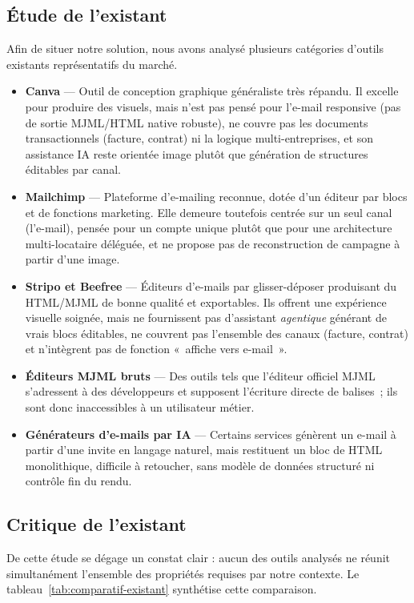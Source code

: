 \documentclass[12pt,a4paper,oneside]{report}
\begin{document}
\subsection{Étude de l'existant}
Afin de situer notre solution, nous avons analysé plusieurs catégories
d'outils existants représentatifs du marché.

\begin{itemize}[leftmargin=1.4cm]
  \item \textbf{Canva} — Outil de conception graphique généraliste très
  répandu. Il excelle pour produire des visuels, mais n'est pas pensé pour
  l'e-mail responsive (pas de sortie MJML/HTML native robuste), ne couvre
  pas les documents transactionnels (facture, contrat) ni la logique
  multi-entreprises, et son assistance IA reste orientée image plutôt que
  génération de structures éditables par canal.

  \item \textbf{Mailchimp} — Plateforme d'e-mailing reconnue, dotée d'un
  éditeur par blocs et de fonctions marketing. Elle demeure toutefois
  centrée sur un seul canal (l'e-mail), pensée pour un compte unique plutôt
  que pour une architecture multi-locataire déléguée, et ne propose pas de
  reconstruction de campagne à partir d'une image.

  \item \textbf{Stripo et Beefree} — Éditeurs d'e-mails par glisser-déposer
  produisant du HTML/MJML de bonne qualité et exportables. Ils offrent une
  expérience visuelle soignée, mais ne fournissent pas d'assistant
  \emph{agentique} générant de vrais blocs éditables, ne couvrent pas
  l'ensemble des canaux (facture, contrat) et n'intègrent pas de
  fonction «~affiche vers e-mail~».

  \item \textbf{Éditeurs MJML bruts} — Des outils tels que l'éditeur
  officiel MJML s'adressent à des développeurs et supposent l'écriture
  directe de balises~; ils sont donc inaccessibles à un utilisateur métier.

  \item \textbf{Générateurs d'e-mails par IA} — Certains services génèrent
  un e-mail à partir d'une invite en langage naturel, mais restituent un
  bloc de HTML monolithique, difficile à retoucher, sans modèle de données
  structuré ni contrôle fin du rendu.
\end{itemize}

\subsection{Critique de l'existant}
De cette étude se dégage un constat clair : aucun des outils analysés ne
réunit simultanément l'ensemble des propriétés requises par notre contexte.
Le tableau~\ref{tab:comparatif-existant} synthétise cette comparaison.
\end{document}
